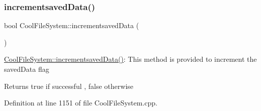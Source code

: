 \subsubsection{\texorpdfstring{incrementsaved\+Data()}{incrementsavedData()}}
{\footnotesize\ttfamily bool Cool\+File\+System\+::incrementsaved\+Data (\begin{DoxyParamCaption}{ }\end{DoxyParamCaption})}

\hyperlink{class_cool_file_system_aae045125288f255f3e258073dcada2a6}{Cool\+File\+System\+::incrementsaved\+Data()}\+: This method is provided to increment the saved\+Data flag

\begin{DoxyReturn}{Returns}
true if successful , false otherwise 
\end{DoxyReturn}


Definition at line 1151 of file Cool\+File\+System.\+cpp.


